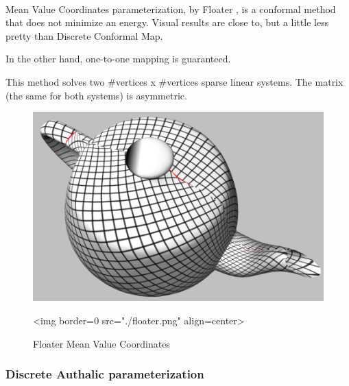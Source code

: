   \\

Mean Value Coordinates parameterization, by Floater \cite{cgal:f-mvc-03},
is a conformal method that does not minimize an energy. Visual results
are close to, but a little less pretty than Discrete Conformal Map.

In the other hand, one-to-one mapping is guaranteed.

This method solves two \#vertices x \#vertices sparse linear systems. The matrix
(the same for both systems) is asymmetric.

\begin{figure}[bht]
    \begin{center}
        \begin{ccTexOnly}
            \includegraphics{Parameterization/floater} %
        \end{ccTexOnly}
        \begin{ccHtmlOnly}
            <img border=0 src="./floater.png" align=center>
        \end{ccHtmlOnly}
        \label{parameterization-fig-floater}

        \caption{Floater Mean Value Coordinates}
    \end{center}
\end{figure}


\subsubsection{Discrete Authalic parameterization}

